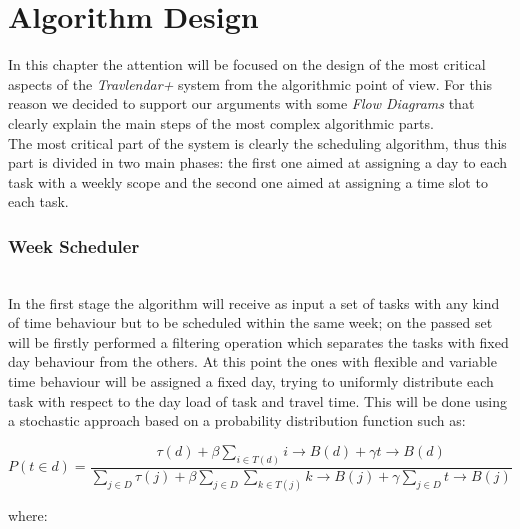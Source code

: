 \chapter{Algorithm Design}
\label{chapter:algo}
In this chapter the attention will be focused on the design of the most critical aspects of the \emph{Travlendar+} system from the algorithmic point of view. For this reason we decided to support our arguments with some \emph{Flow Diagrams} that clearly explain the main steps of the most complex algorithmic parts.
\\The most critical part of the system is clearly the scheduling algorithm, thus this part is divided in two main phases: the first one aimed at assigning a day to each task with a weekly scope and the second one aimed at assigning a time slot to each task.  

\subsection{Week Scheduler}
\\In the first stage the algorithm will receive as input a set of tasks with any kind of time behaviour but to be scheduled within the same week; on the passed set will be firstly performed a filtering operation which separates the tasks with fixed day behaviour from the others. 
At this point the ones with flexible and variable time behaviour will be assigned a fixed day, trying to uniformly distribute each task with respect to the day load of task and travel time. This will be done using a stochastic approach based on a probability distribution function such as:  

\begin{equation}
    P( t \in d) = \frac{\tau(d) + \beta \sum\limits_{i \in T(d)}{i \rightarrow B(d)} + \gamma t \rightarrow B(d)}
    {\sum\limits_{j \in D}{\tau(j)} + \beta \sum\limits_{j \in D}{\sum\limits_{k \in T(j)}{k \rightarrow B(j)}} + \gamma \sum\limits_{j \in D}{t \rightarrow B(j)}}
\end{equation}  

    \newpage
    where:
    
